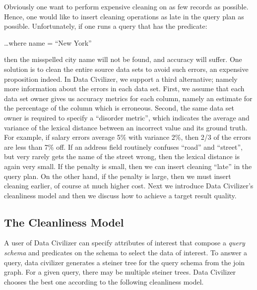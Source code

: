 Obviously one want to perform expensive cleaning on as few records as possible.
Hence, one would like to insert cleaning operations as late in the query plan as
possible. Unfortunately, if one runs a query that has the predicate:

…where name = “New York”

then the misspelled city name will not be found, and accuracy will suffer.  One
solution is to clean the entire source data sets to avoid such errors, an
expensive proposition indeed. In Data Civilizer, we support a third
alternative; namely more information about the errors in each data set. First,
we assume that each data set owner gives us accuracy metrics for each
column,
namely an estimate for the percentage of the column which is erroneous.  Second,
the same data set owner is required to specify a “disorder metric”, which
indicates the average and variance of the lexical distance between an incorrect
value and its ground truth. For example, if salary errors average 5\% with
variance 2\%, then 2/3 of the errors are less than 7\% off. If an address field
routinely confuses “road” and “street”, but very rarely gets the name of the
street wrong, then the lexical distance is again very small. If the penalty is
small, then we can insert cleaning “late” in the query plan. On the other hand,
if the penalty is large, then we must insert cleaning earlier, of course at much
higher cost. Next we introduce Data Civilizer's cleanliness model
and then we discuss how to achieve a target result quality.



\subsection{The Cleanliness Model}
\label{subsec:model:recall}

A user of Data Civilizer can specify attributes of interest that compose a
\emph{query schema} and predicates on the schema to select the data of interest.
To answer a query, data civilizer generates a steiner tree for the query schema
from the join graph. For a given query, there may be multiple steiner trees.
Data Civilizer chooses the best one according to the following cleanliness
model.

